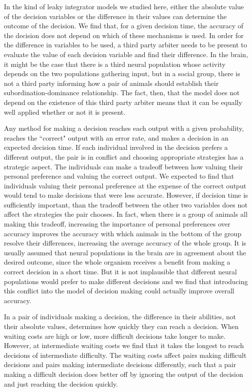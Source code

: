 \documentclass{article}
\begin{document}
In the kind of leaky integrator models we studied here, either the absolute value of the decision variables or the difference in their values can determine the outcome of the decision.  We find that, for a given decision time, the accuracy of the decision does not depend on which of these mechanisms is used.  In order for the difference in variables to be used, a third party arbiter needs to be present to evaluate the value of each decision variable and find their difference.  In the brain, it might be the case that there is a third neural population whose activity depends on the two populations gathering input, but in a social group, there is not a third party informing how a pair of animals should establish their subordination-dominance relationship.  The fact, then, that the model does not depend on the existence of this third party arbiter means that it can be equally well applied whether or not it is present. 

Any method for making a decision reaches each output with a given probability, reaches the ``correct" output with an error rate, and makes a decision in an expected decision time. If each individual involved in the decision prefers a different output, the pair is in conflict and choosing appropriate strategies has a strategic aspect.  The individuals can make a tradeoff between how valuing their personal preference and valuing the correct output.  We expected to find that individuals valuing their personal preference at the expense of the correct output would tend to make decisions that were less accurate.  However, if decision time is sufficiently important, than the tradeoff between the other two variables does not affect the strategies the pair chooses.  In fact, when there is a group of animals all making this tradeoff, increasing the importance of personal preferences over accuracy improves the accuracy with which animals in the bottom of the group resolve their differences, increasing the average accuracy of the whole group.  It is usually assumed that neural populations in the brain are in agreement about the desired outcome, since the whole organism receives a benefit from making a correct decision in a short time.  But it is not implausible that different neural populations would prefer to make different decisions and we find that introducing this conflict into the model of decision making could actually improve overall accuracy.

In a pair of individuals making a decision, the difference in their abilities, not their absolute values, determines how quickly they can reach a decision.  When waiting costs are high or low, more difficult decisions take longer to make.  However, at intermediate waiting costs we find that it takes the longest to reach decisions of intermediate difficulty.  The waiting costs affect pairs making difficult decisions and pairs making intermediate decisions differently, such that a pair making a difficult decision does better off by ignoring the output of the decision and just reaching the decision quickly.  
\end{document}
